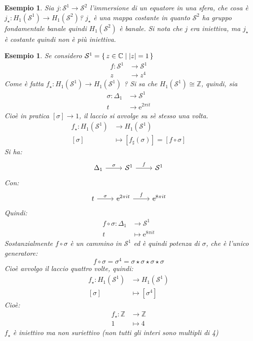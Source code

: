 \documentclass[10pt, twoside=false, x11names]{scrbook}
\newtheorem{example}[theorem]{Esempio}
\newcommand{\Z}{\mathbb{Z}}
\newcommand{\me}{\mathrm{e}}
\newcommand{\Sph}[1][]{\mathcal{S}^#1}
\begin{document}
\begin{example}
  Sia $ j \colon \Sph{1} \to \Sph{2} $ l'immersione di un equatore in una sfera,
  che cosa è $ j_\star \colon H_1(\Sph{1}) \to H_1(\Sph{2}) $?
  $ j_\star $ è una mappa costante in quanto $ \Sph{2} $ ha gruppo fondamentale banale
  quindi $ H_1(\Sph{2}) $ è banale. Si nota che $ j $ era iniettiva,
  ma $ j_\star $ è costante quindi non è più iniettiva.
\end{example}
\begin{example}
  Se considero $ \Sph{1} = \set{z \in \mathbb{C} | |z| = 1 } $
  \begin{align*}
    f \colon \Sph{1} & \to \Sph{1} \\
    z & \to z^4
  \end{align*}
  Come è fatta $ f_\star \colon H_1(\Sph{1}) \to H_1(\Sph{1})$ ?
  Si sa che $ H_1(\Sph{1}) \cong \Z $, quindi, sia
  \begin{align*}
    \sigma \colon \Delta_1 & \to \Sph{1} \\
    t & \to \me^{2 \pi i t}
  \end{align*}
  Cioè in pratica $ [\sigma] \to 1 $, il laccio si avvolge su sè stesso una volta.
  \begin{align*}
    f_\star \colon H_1(\Sph{1}) & \to H_1(\Sph{1}) \\
    [\sigma] & \mapsto [f_\sharp (\sigma)] = [f \circ \sigma]
  \end{align*}
  Si ha:
  \[
    \begin{tikzcd}
      \Delta_1 \arrow{r}{\sigma} & \Sph{1} \arrow{r}{f} & \Sph{1}
    \end{tikzcd}
  \]
  Con:
  \[
    \begin{tikzcd}
      t \arrow{r}{\sigma} & \me^{2 \pi i t} \arrow{r}{f} & \me^{8 \pi i t}
    \end{tikzcd}
  \]
  Quindi:
  \begin{align*}
    f \circ \sigma \colon \Delta_1 & \to \Sph{1} \\
    t & \mapsto \me^{8 \pi i t}
  \end{align*}
  Sostanzialmente $ f \circ \sigma $ è un cammino in $ \Sph{1} $ ed è
  quindi potenza di $ \sigma $, che è l'unico generatore:
  \[
    f \circ \sigma = \sigma^4 = \sigma \star \sigma \star \sigma \star \sigma
  \]
  Cioè avvolgo il laccio quattro volte, quindi:
  \begin{align*}
    f_\star \colon H_1(\Sph{1}) & \to H_1(\Sph{1}) \\
    [\sigma] & \mapsto [\sigma^4]
  \end{align*}
  Cioè:
  \begin{align*}
    f_\star \colon \Z & \to \Z \\
    1 & \mapsto 4
  \end{align*}
  $ f_\star $ è iniettivo ma non suriettivo (non tutti gli interi sono
  multipli di 4)
\end{example}
\end{document}
